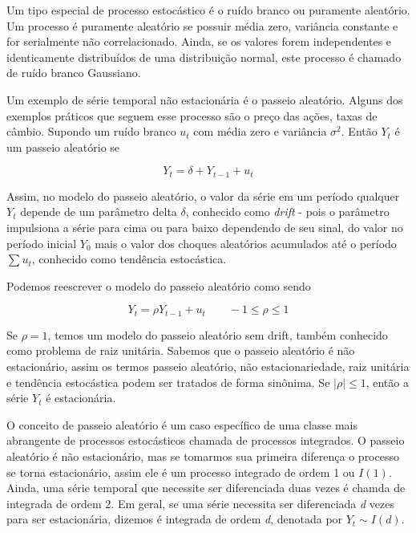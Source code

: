 \documentclass[twocolumn]{rbef}
\newcommand{\1}{\mathbbm{1}}
\begin{document}
Um tipo especial de processo estocástico é o ruído branco ou puramente aleatório. Um processo é puramente aleatório se possuir média zero, variância constante e for serialmente não correlacionado. Ainda, se os valores forem independentes e identicamente distribuídos de uma distribuição normal, este processo é chamado de ruído branco Gaussiano.

Um exemplo de série temporal não estacionária é o passeio aleatório. Alguns dos exemplos práticos que seguem esse processo são o preço das ações, taxas de câmbio. Supondo um ruído branco $u_{t}$ com média zero e variância $\sigma^{2}$. Então $Y_{t}$ é um passeio aleatório se

\begin{equation}
Y_{t} = \delta + Y_{t-1} + u_{t}
\end{equation}

Assim, no modelo do passeio aleatório, o valor da série em um período qualquer $Y_{t}$ depende de um parâmetro delta $\delta$, conhecido como \textit{drift} - pois o parâmetro impulsiona a série para cima ou para baixo dependendo de seu sinal, do valor no período inicial $Y_{0}$ mais o valor dos choques aleatórios acumulados até o período $\sum u_{t}$, conhecido como tendência estocástica.

Podemos reescrever o modelo do passeio aleatório como sendo

\begin{equation} \label{unit_root_eq}
    Y_{t} = \rho Y_{t-1} + u_{t} \qquad -1 \leq \rho \leq 1
\end{equation}

Se $\rho = 1$, temos um modelo do passeio aleatório sem drift, também conhecido como problema de raiz unitária. Sabemos que o passeio aleatório é não estacionário, assim os termos passeio aleatório, não estacionariedade, raiz unitária e tendência estocástica podem ser tratados de forma sinônima. Se $|\rho| \leq 1$, então a série $Y_{t}$ é estacionária.

O conceito de passeio aleatório é um caso específico de uma classe mais abrangente de processos estocásticos chamada de processos integrados. O passeio aleatório é não estacionário, mas se tomarmos sua primeira diferença o processo se torna estacionário, assim ele é um processo integrado de ordem 1 ou $I(1)$. Ainda, uma série temporal que necessite ser diferenciada duas vezes é chamda de integrada de ordem 2. Em geral, se uma série necessita ser diferenciada \textit{d} vezes para ser estacionária, dizemos é integrada de ordem \textit{d}, denotada por $Y_{t} \sim I(d)$.
\end{document}
